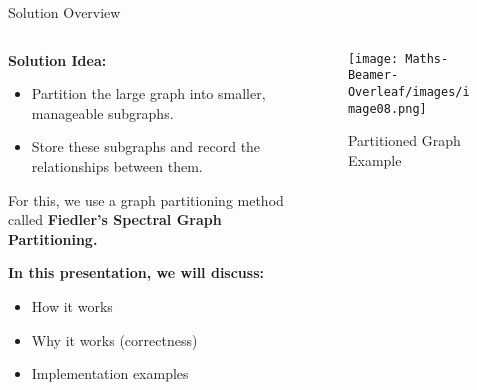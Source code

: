 \documentclass[aspectratio=169]{beamer}
\begin{document}
\begin{frame}{Solution Overview}

\begin{columns}

    \begin{column}{0.6\textwidth}
        \textbf{Solution Idea:}
        \begin{itemize}
            \item Partition the large graph into smaller, manageable subgraphs.
            \item Store these subgraphs and record the relationships between them.
        \end{itemize}

        \vspace{0.3cm}
        For this, we use a graph partitioning method called \textbf{Fiedler's Spectral Graph Partitioning.}

        \vspace{0.3cm}
        \textbf{In this presentation, we will discuss:}
        \begin{itemize}
            \item How it works
            \item Why it works (correctness)
            \item Implementation examples
        \end{itemize}
    \end{column}

    \begin{column}{0.4\textwidth}
        \begin{figure}
            \centering
            \texttt{[image: Maths-Beamer-Overleaf/images/image08.png]}
            \caption*{\small Partitioned Graph Example}
        \end{figure}
    \end{column}

\end{columns}

\end{frame}
\end{document}
